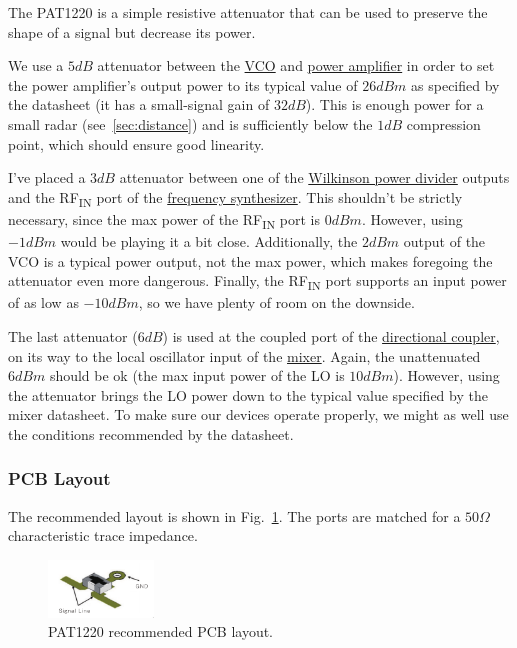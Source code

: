 The PAT1220 is a simple resistive attenuator that can be used to preserve the shape of a signal but
decrease its power.

We use a $5 \si{dB}$ attenuator between the \hyperref[sec:hmc431lp4rf]{VCO} and
\hyperref[sec:se2567l]{power amplifier} in order to set the power amplifier's output power to its
typical value of $26 \si{dBm}$ as specified by the datasheet (it has a small-signal gain of
$32 \si{dB}$). This is enough power for a small radar (see~\cref{sec:distance}) and is sufficiently
below the $1 \si{dB}$ compression point, which should ensure good linearity.

I've placed a $3 \si{dB}$ attenuator between one of the \hyperref[sec:pd4859j5050s2hf]{Wilkinson
  power divider} outputs and the RF\textsubscript{IN} port of the \hyperref[sec:adf4158]{frequency
  synthesizer}. This shouldn't be strictly necessary, since the max power of the
RF\textsubscript{IN} port is $0 \si{dBm}$. However, using $-1 \si{dBm}$ would be playing it a bit
close. Additionally, the $2 \si{dBm}$ output of the VCO is a typical power output, not the max
power, which makes foregoing the attenuator even more dangerous. Finally, the RF\textsubscript{IN}
port supports an input power of as low as $-10 \si{dBm}$, so we have plenty of room on the downside.

The last attenuator ($6 \si{dB}$) is used at the coupled port of the
\hyperref[sec:dc4759j5020ahf]{directional coupler}, on its way to the local oscillator input of the
\hyperref[sec:adl5802]{mixer}. Again, the unattenuated $6 \si{dBm}$ should be ok (the max input
power of the LO is $10 \si{dBm}$). However, using the attenuator brings the LO power down to the
typical value specified by the mixer datasheet. To make sure our devices operate properly, we might
as well use the conditions recommended by the datasheet.

\subsubsection{PCB Layout}
\label{sec:pat1220-pcb-layout}

The recommended layout is shown in Fig.~\ref{fig:pat1220-pcb}. The ports are matched for a $50
\si{\Omega}$ characteristic trace impedance.

\begin{figure}[h]
        \centering
        \includegraphics[width=0.25\textwidth]{data/pat1220-pcb}
        \caption{PAT1220 recommended PCB layout.}
        \label{fig:pat1220-pcb}
\end{figure}

